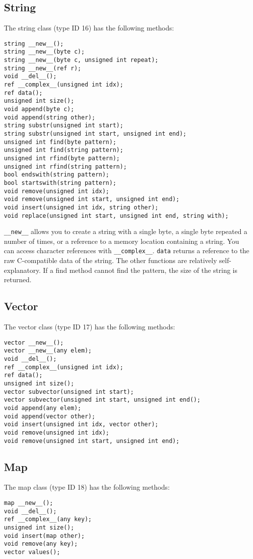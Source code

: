 \documentclass[10pt,a4paper]{article}
\begin{document}
\subsection{String}
\label{sec:stringClass}
The string class (type ID 16) has the following methods:
\begin{verbatim}
string __new__();
string __new__(byte c);
string __new__(byte c, unsigned int repeat);
string __new__(ref r);
void __del__();
ref __complex__(unsigned int idx);
ref data();
unsigned int size();
void append(byte c);
void append(string other);
string substr(unsigned int start);
string substr(unsigned int start, unsigned int end);
unsigned int find(byte pattern);
unsigned int find(string pattern);
unsigned int rfind(byte pattern);
unsigned int rfind(string pattern);
bool endswith(string pattern);
bool startswith(string pattern);
void remove(unsigned int idx);
void remove(unsigned int start, unsigned int end);
void insert(unsigned int idx, string other);
void replace(unsigned int start, unsigned int end, string with);
\end{verbatim}

\verb|__new__| allows you to create a string with a single byte, a single byte repeated a number of times, or a reference to a memory location containing a string. You can access character references with \verb|__complex__|. \verb|data| returns a reference to the raw C-compatible data of the string. The other functions are relatively self-explanatory. If a find method cannot find the pattern, the size of the string is returned.

\subsection{Vector}
\label{sec:vectorClass}
The vector class (type ID 17) has the following methods:
\begin{verbatim}
vector __new__();
vector __new__(any elem);
void __del__();
ref __complex__(unsigned int idx);
ref data();
unsigned int size();
vector subvector(unsigned int start);
vector subvector(unsigned int start, unsigned int end();
void append(any elem);
void append(vector other);
void insert(unsigned int idx, vector other);
void remove(unsigned int idx);
void remove(unsigned int start, unsigned int end);
\end{verbatim}

\subsection{Map}
\label{sec:mapClass}
The map class (type ID 18) has the following methods:
\begin{verbatim}
map __new__();
void __del__();
ref __complex__(any key);
unsigned int size();
void insert(map other);
void remove(any key);
vector values();
\end{verbatim}
\end{document}
